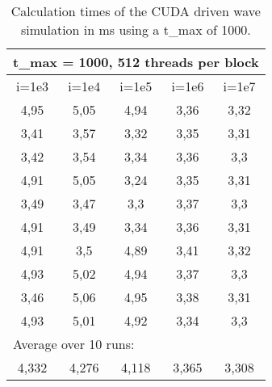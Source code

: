 \documentclass[a4paper]{article}
\begin{document}
		
		\begin{table}[H]
			\label{table:i_change_1000}
			\caption{Calculation times of the CUDA driven wave simulation in ms using a t\_max of 1000.}
			\begin{center}
				\begin{tabular}{| c | c | c | c | c |}
					\hline
					\multicolumn{5}{|l|}{t\_max = 1000, 512 threads per block}\\
					\hline
					i=1e3 & i=1e4 & i=1e5 & i=1e6 & i=1e7\\ 
					\hline
					4,95 & 5,05 & 4,94 & 3,36 & 3,32\\ 
					\hline
					3,41 & 3,57 & 3,32 & 3,35 & 3,31\\ 
					\hline
					3,42 & 3,54 & 3,34 & 3,36 & 3,3\\ 
					\hline
					4,91 & 5,05 & 3,24 & 3,35 & 3,31\\ 
					\hline
					3,49 & 3,47 & 3,3 & 3,37 & 3,3\\ 
					\hline
					4,91 & 3,49 & 3,34 & 3,36 & 3,31\\ 
					\hline
					4,91 & 3,5 & 4,89 & 3,41 & 3,32\\ 
					\hline
					4,93 & 5,02 & 4,94 & 3,37 & 3,3\\ 
					\hline
					3,46 & 5,06 & 4,95 & 3,38 & 3,31\\ 
					\hline
					4,93 & 5,01 & 4,92 & 3,34 & 3,3\\ 
					\hline
					\multicolumn{5}{|l|}{Average over 10 runs:}\\
					\hline
					4,332 & 4,276 & 4,118 & 3,365 & 3,308\\ 
					\hline
				\end{tabular}
			\end{center}
		\end{table}
		
\end{document}

